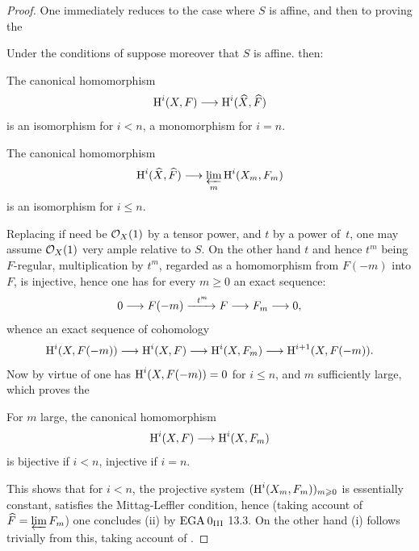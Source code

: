 \begin{proof}
One immediately reduces to the case where $S$ is affine, and then to proving the

\begin{corollary} \label{XII.2.2}
Under the conditions of  suppose moreover that $S$ is affine. then:
\begin{enumeratei}
\item
The canonical homomorphism
\[
\H^i(X, F) \to \H^i(\widehat{X}, \widehat{F})
\]
is an isomorphism for $i<n$, a monomorphism for $i=n$.
\item
The canonical homomorphism
\[
\H^i(\widehat{X}, \widehat{F}) \to \varprojlim_m \H^i(X_m, F_m)
\]
is an isomorphism for $i\leq n$.
\end{enumeratei}
\end{corollary}

Replacing if need be $\mathcal{O}_X(1)$ by a tensor power, and $t$ by a power of~$t$, one may assume $\mathcal{O}_X(1)$ very ample relative to $S$. On the other hand $t$ and hence $t^m$ being $F$-regular, multiplication by $t^m$, regarded as a homomorphism from $F(-m)$ into $F$, is injective, hence one has for every $m\geq 0$ an exact sequence:
\steco
\begin{equation} \label{eq:XII.14}
0\to F(-m) \lto{t^m} F \to F_m \to0,
\end{equation}
whence an exact sequence of cohomology
\[
\H^i(X, F(-m)) \to \H^i(X, F) \to \H^i(X, F_m) \to \H^{i+1}(X, F(-m)).
\]
Now by virtue of  one has $\operatorname{H}^i(X, F(-m))=0$ for $i\leq n$, and $m$ sufficiently large, which proves the

\begin{lemma} \label{XII.2.3}
For $m$ large, the canonical homomorphism
\[
\H^i(X, F) \to \H^i(X, F_m)
\]
is bijective if $i<n$, injective if $i=n$.
\end{lemma}

%
This shows that for $i<n$, the projective system $(\operatorname{H}^i(X_m, F_m))_{m\geqslant 0}$ is essentially constant, \afortiori satisfies the Mittag-Leffler condition, hence (taking account of $\widehat{F}= \varprojlim F_m$) one concludes (ii) by $\textup{EGA}\kern.2em 0_{\textup{III}}$ 13.3. On the other hand (i) follows trivially from this, taking account of .


\end{proof}

